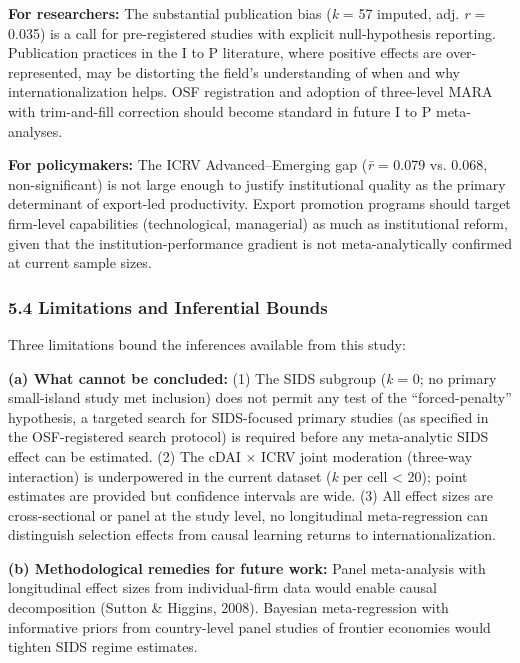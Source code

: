 \documentclass[
  12pt,a4paper]{article}
\begin{document}
\textbf{For researchers:} The substantial publication bias (\emph{k} =
57 imputed, adj. \emph{r} = 0.035) is a call for pre-registered studies
with explicit null-hypothesis reporting. Publication practices in the I
to P literature, where positive effects are over-represented, may be
distorting the field's understanding of when and why
internationalization helps. OSF registration and adoption of three-level
MARA with trim-and-fill correction should become standard in future I to
P meta-analyses.

\textbf{For policymakers:} The ICRV Advanced--Emerging gap (\emph{r̄} =
0.079 vs. 0.068, non-significant) is not large enough to justify
institutional quality as the primary determinant of export-led
productivity. Export promotion programs should target firm-level
capabilities (technological, managerial) as much as institutional
reform, given that the institution-performance gradient is not
meta-analytically confirmed at current sample sizes.

\hypertarget{limitations-and-inferential-bounds}{%
\subsubsection{5.4 Limitations and Inferential
Bounds}\label{limitations-and-inferential-bounds}}

Three limitations bound the inferences available from this study:

\textbf{(a) What cannot be concluded:} (1) The SIDS subgroup (\emph{k} =
0; no primary small-island study met inclusion) does not permit any test
of the ``forced-penalty'' hypothesis, a targeted search for SIDS-focused
primary studies (as specified in the OSF-registered search protocol) is required before any
meta-analytic SIDS effect can be estimated. (2) The cDAI × ICRV joint
moderation (three-way interaction) is underpowered in the current
dataset (\emph{k} per cell \textless{} 20); point estimates are provided
but confidence intervals are wide. (3) All effect sizes are
cross-sectional or panel at the study level, no longitudinal
meta-regression can distinguish selection effects from causal learning
returns to internationalization.

\textbf{(b) Methodological remedies for future work:} Panel
meta-analysis with longitudinal effect sizes from individual-firm data
would enable causal decomposition (Sutton \& Higgins, 2008). Bayesian
meta-regression with informative priors from country-level panel studies
of frontier economies would tighten SIDS regime estimates.
\end{document}
